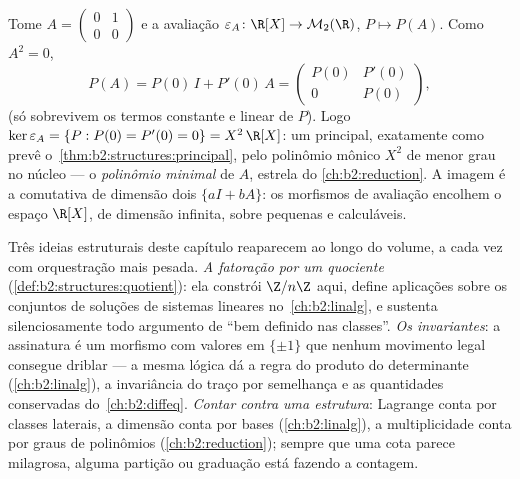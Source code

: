 \begin{example}\label{ex:b2:structures:evaluation}
Tome $A = \begin{pmatrix}0 & 1\\ 0 & 0\end{pmatrix}$ e a
avaliação $\varepsilon_A \colon \R[X] \to \mathcal{M}_2(\R)$,
$P \mapsto P(A)$. Como $A^2 = 0$,
\[
P(A) = P(0)\,I + P'(0)\,A =
\begin{pmatrix} P(0) & P'(0)\\ 0 & P(0)\end{pmatrix},
\]
(só sobrevivem os termos constante e linear de $P$). Logo
$\ker\varepsilon_A = \{P : P(0) = P'(0) = 0\} = X^2\,\R[X]$: um
 principal, exatamente como prevê o~\cref{thm:b2:structures:principal},
 pelo polinômio mônico $X^2$ de menor grau no
núcleo --- o \emph{polinômio minimal} de $A$, estrela do
\cref{ch:b2:reduction}. A imagem é a  comutativa
de dimensão dois $\{aI + bA\}$: os morfismos de avaliação encolhem
o espaço $\R[X]$, de dimensão infinita, sobre  pequenas e calculáveis.
\end{example}

\begin{remark}\label{rem:b2:structures:perspectives}
Três ideias estruturais deste capítulo reaparecem ao longo do
volume, a cada vez com orquestração mais pesada. \emph{A fatoração
por um quociente} (\cref{def:b2:structures:quotient}): ela
constrói $\Z/n\Z$ aqui, define aplicações sobre os conjuntos de soluções de
sistemas lineares no~\cref{ch:b2:linalg}, e sustenta silenciosamente todo
argumento de ``bem definido nas classes''. \emph{Os invariantes}: a
assinatura é um morfismo com valores em $\{\pm1\}$ que nenhum movimento legal
consegue driblar --- a mesma lógica dá a regra do produto do determinante
(\cref{ch:b2:linalg}), a invariância do traço por semelhança e
as quantidades conservadas do~\cref{ch:b2:diffeq}.
\emph{Contar contra uma estrutura}: Lagrange conta por
classes laterais, a dimensão conta por bases
(\cref{ch:b2:linalg}), a multiplicidade conta por graus de polinômios
(\cref{ch:b2:reduction}); sempre que uma cota parece
milagrosa, alguma partição ou graduação está fazendo a contagem.
\end{remark}

